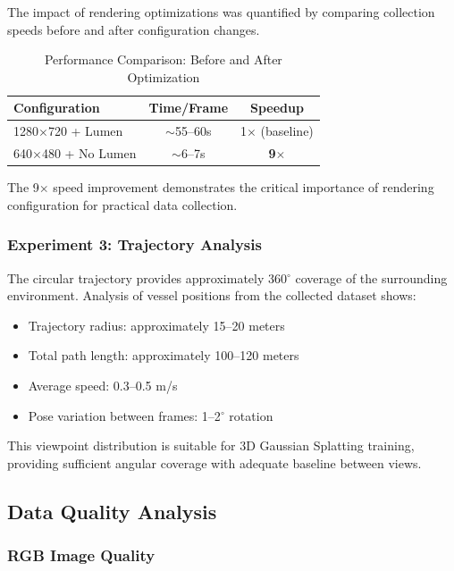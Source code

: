 The impact of rendering optimizations was quantified by comparing collection speeds before and after configuration changes.

\begin{table}[htbp]
\centering
\caption{Performance Comparison: Before and After Optimization}
\label{tab:performance}
\begin{tabular}{@{}lcc@{}}
\toprule
\textbf{Configuration} & \textbf{Time/Frame} & \textbf{Speedup} \\
\midrule
1280$\times$720 + Lumen & $\sim$55--60s & 1$\times$ (baseline) \\
640$\times$480 + No Lumen & $\sim$6--7s & \textbf{9$\times$} \\
\bottomrule
\end{tabular}
\end{table}

The 9$\times$ speed improvement demonstrates the critical importance of rendering configuration for practical data collection.

\subsubsection{Experiment 3: Trajectory Analysis}

The circular trajectory provides approximately 360$^\circ$ coverage of the surrounding environment. Analysis of vessel positions from the collected dataset shows:

\begin{itemize}
    \item Trajectory radius: approximately 15--20 meters
    \item Total path length: approximately 100--120 meters
    \item Average speed: 0.3--0.5 m/s
    \item Pose variation between frames: 1--2$^\circ$ rotation
\end{itemize}

This viewpoint distribution is suitable for 3D Gaussian Splatting training, providing sufficient angular coverage with adequate baseline between views.

\subsection{Data Quality Analysis}

\subsubsection{RGB Image Quality}

